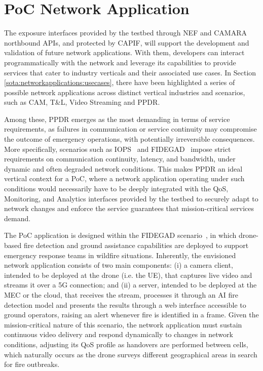 \section{\acs{PoC} Network Application}
\label{chap:proposal:netapp}

The exposure interfaces provided by the testbed through \acs{NEF} and CAMARA northbound \acsp{API}, and protected by \acs{CAPIF}, will support the development and validation of future network applications. With them, developers can interact programmatically with the network and leverage its capabilities to provide services that cater to industry verticals and their associated use cases. In Section \ref{sota:networkapplications:usecases}, there have been highlighted a series of possible network applications across distinct vertical industries and scenarios, such as \acl{CAM}, \acl{T&L}, Video Streaming and \acf{PPDR}.

Among these, \acs{PPDR} emerges as the most demanding in terms of service requirements, as failures in communication or service continuity may compromise the outcome of emergency operations, with potentially irreversible consequences. More specifically, scenarios such as \acs{IOPS}~\cite{IOPS5G} and \acs{FIDEGAD}~\cite{FIDEGAD5G} impose strict requirements on communication continuity, latency, and bandwidth, under dynamic and often degraded network conditions. This makes \acs{PPDR} an ideal vertical context for a \acl{PoC}, where a network application operating under such conditions would necessarily have to be deeply integrated with the \acs{QoS}, Monitoring, and Analytics interfaces provided by the testbed to securely adapt to network changes and enforce the service guarantees that mission-critical services demand.

The \acs{PoC} application is designed within the \acs{FIDEGAD} scenario~\cite{FIDEGAD5G}, in which drone-based fire detection and ground assistance capabilities are deployed to support emergency response teams in wildfire situations. Inherently, the envisioned network application consists of two main components: (i) a camera client, intended to be deployed at the drone (i.e. the \acs{UE}), that captures live video and streams it over a \acs{5G} connection; and (ii) a server, intended to be deployed at the \acs{MEC} or the cloud, that receives the stream, processes it through an \acs{AI} fire detection model and presents the results through a web interface accessible to ground operators, raising an alert whenever fire is identified in a frame. Given the mission-critical nature of this scenario, the network application must sustain continuous video delivery and respond dynamically to changes in network conditions, adjusting its \acs{QoS} profile as handovers are performed between cells, which naturally occurs as the drone surveys different geographical areas in search for fire outbreaks.

